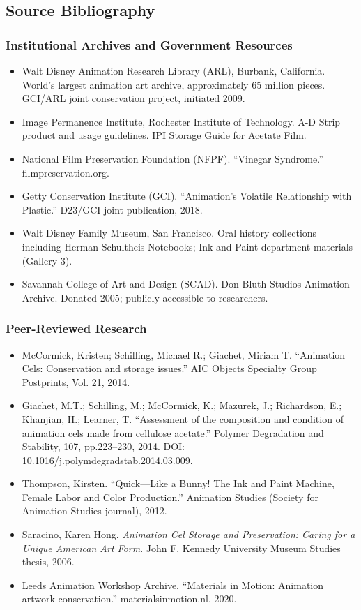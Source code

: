 \documentclass[11pt,letterpaper]{article}
\begin{document}
\subsection{Source Bibliography}

\subsubsection{Institutional Archives and Government Resources}
\begin{itemize}
  \item Walt Disney Animation Research Library (ARL), Burbank, California. World's largest animation art archive, approximately 65 million pieces. GCI/ARL joint conservation project, initiated 2009.
  \item Image Permanence Institute, Rochester Institute of Technology. A-D Strip product and usage guidelines. IPI Storage Guide for Acetate Film.
  \item National Film Preservation Foundation (NFPF). ``Vinegar Syndrome.'' filmpreservation.org.
  \item Getty Conservation Institute (GCI). ``Animation's Volatile Relationship with Plastic.'' D23/GCI joint publication, 2018.
  \item Walt Disney Family Museum, San Francisco. Oral history collections including Herman Schultheis Notebooks; Ink and Paint department materials (Gallery 3).
  \item Savannah College of Art and Design (SCAD). Don Bluth Studios Animation Archive. Donated 2005; publicly accessible to researchers.
\end{itemize}

\subsubsection{Peer-Reviewed Research}
\begin{itemize}
  \item McCormick, Kristen; Schilling, Michael R.; Giachet, Miriam T. ``Animation Cels: Conservation and storage issues.'' AIC Objects Specialty Group Postprints, Vol. 21, 2014.
  \item Giachet, M.T.; Schilling, M.; McCormick, K.; Mazurek, J.; Richardson, E.; Khanjian, H.; Learner, T. ``Assessment of the composition and condition of animation cels made from cellulose acetate.'' Polymer Degradation and Stability, 107, pp.223--230, 2014. DOI: 10.1016/j.polymdegradstab.2014.03.009.
  \item Thompson, Kirsten. ``Quick---Like a Bunny! The Ink and Paint Machine, Female Labor and Color Production.'' Animation Studies (Society for Animation Studies journal), 2012.
  \item Saracino, Karen Hong. \textit{Animation Cel Storage and Preservation: Caring for a Unique American Art Form}. John F. Kennedy University Museum Studies thesis, 2006.
  \item Leeds Animation Workshop Archive. ``Materials in Motion: Animation artwork conservation.'' materialsinmotion.nl, 2020.
\end{itemize}
\end{document}
